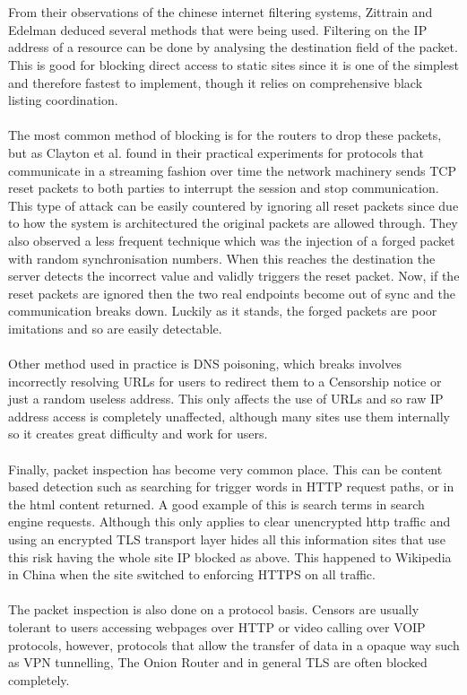 \documentclass[12pt,a4paper]{article}
\begin{document}
\\\\
From their observations of the chinese internet filtering systems, Zittrain and Edelman\cite{edelman2005empirical} deduced several methods that were being used. Filtering on the IP address of a resource can be done by analysing the destination field of the packet. This is good for blocking direct access to static sites since it  is one of the simplest and therefore fastest to implement, though it relies on comprehensive black listing coordination.
\\\\
The most common method of blocking is for the routers to drop these packets, but as Clayton et al. found in their practical experiments\cite{clayton2006ignoring} for protocols that communicate in a streaming fashion over time the network machinery sends TCP reset packets to both parties to interrupt the session and stop communication. This type of attack can be easily countered by ignoring all reset packets since due to how the system is architectured the original packets are allowed through. They also observed a less frequent technique which was the injection of a forged packet with random synchronisation numbers. When this reaches the destination the server detects the incorrect value and validly triggers the reset packet. Now, if the reset packets are ignored then the two real endpoints become out of sync and the communication breaks down. Luckily as it stands, the forged packets are poor imitations and so are easily detectable.
\\\\
Other method used in practice is DNS poisoning, which breaks involves incorrectly resolving URLs for users to redirect them to a Censorship notice or just a random useless address. This only affects the use of URLs and so raw IP address access is completely unaffected, although many sites use them internally so it creates great difficulty and work for users.
\\\\
Finally, packet inspection has become very common place. This can be content based detection such as searching for trigger words in HTTP request paths, or in the html content returned. A good example of this is search terms in search engine requests. Although this only applies to clear unencrypted http traffic and using an encrypted  TLS transport layer hides all this information sites that use this risk having the whole site IP blocked as above. This happened to Wikipedia in China when the site switched to enforcing HTTPS on all traffic.
\\\\
The packet inspection is also done on a protocol basis. Censors are usually tolerant to users accessing webpages over HTTP or video calling over VOIP protocols, however, protocols that allow the transfer of data in a opaque way such as VPN tunnelling, The Onion Router and in general TLS are often blocked completely.
\end{document}
